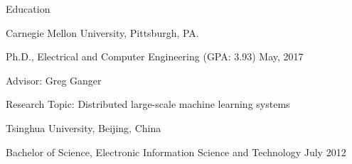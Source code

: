 \documentclass{resume} %
\begin{document}

\begin{rSection}{Education}

\begin{rSubsection}{\hspace{-1em} Carnegie Mellon University, Pittsburgh, PA.}{}{}{}
\vspace{-0.3em}
\item[] \hspace{-2em} Ph.D., Electrical and Computer Engineering (GPA: 3.93) \hfill May, 2017
\item Advisor: Greg Ganger
\item Research Topic: Distributed large-scale machine learning systems
\end{rSubsection}

\begin{rSubsection}{\hspace{-1em} Tsinghua University, Beijing, China}{}{}{}
\item[] \hspace{-2em} Bachelor of Science, Electronic Information Science and Technology \hfill July 2012
\end{rSubsection}

\end{rSection}
\end{document}
